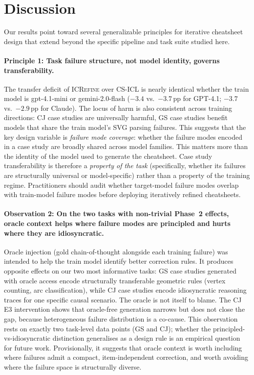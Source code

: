\documentclass{article}
\begin{document}



\section{Discussion}
\label{sec:discussion}

Our results point toward several generalizable principles for iterative cheatsheet design
that extend beyond the specific pipeline and task suite studied here.

\paragraph{Principle 1: Task failure structure, not model identity, governs transferability.}
The transfer deficit of \textsc{ICRefine} over CS-ICL is nearly identical whether the
train model is gpt-4.1-mini or gemini-2.0-flash ($-3.4$ vs.\ $-3.7$\,pp for GPT-4.1;
$-3.7$ vs.\ $-2.9$\,pp for Claude).
The locus of harm is also consistent across training directions: CJ case studies are
universally harmful, GS case studies benefit models that share the train model's SVG parsing
failures.
This suggests that the key design variable is \emph{failure mode coverage}: whether the
failure modes encoded in a case study are broadly shared across model families. This matters
more than the identity of the model used to generate the cheatsheet.
Case study transferability is therefore a \emph{property of the task} (specifically, whether
its failures are structurally universal or model-specific) rather than a property of the
training regime.
Practitioners should audit whether target-model failure modes overlap with train-model failure
modes before deploying iteratively refined cheatsheets.

\paragraph{Observation 2: On the two tasks with non-trivial Phase~2 effects, oracle context helps
where failure modes are principled and hurts where they are idiosyncratic.}
Oracle injection (gold chain-of-thought alongside each training failure) was intended to help
the train model identify better correction rules.
It produces opposite effects on our two most informative tasks: GS case studies generated
with oracle access encode structurally transferable geometric rules (vertex counting, arc
classification), while CJ case studies encode idiosyncratic reasoning traces for one specific
causal scenario.
The oracle is not itself to blame. The CJ E3 intervention shows that oracle-free generation
narrows but does not close the gap, because heterogeneous failure distribution is a
co-cause.
This observation rests on exactly two task-level data points (GS and CJ); whether the
principled-vs-idiosyncratic distinction generalises as a design rule is an empirical question
for future work.
Provisionally, it suggests that oracle context is worth including where failures admit a
compact, item-independent correction, and worth avoiding where the failure space is
structurally diverse.
\end{document}
